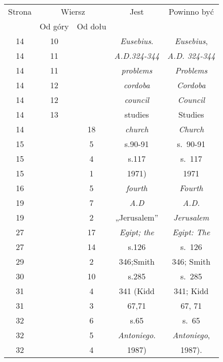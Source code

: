 \documentclass[a4paper,11pt]{article}
\numberwithin{equation}{section}
\begin{document}
\begin{center}

  \begin{tabular}{|c|c|c|c|c|}
    \hline
    Strona & \multicolumn{2}{c|}{Wiersz} & Jest
                              & Powinno być \\ \cline{2-3}
    & Od góry & Od dołu & & \\
    \hline
    \hphantom{0}14 & 10 & & \textit{Eusebius}. & \textit{Eusebius}, \\
    \hphantom{0}14 & 11 & & \textit{A.D.324-344} & \textit{A.D. 324-344} \\
    \hphantom{0}14 & 11 & & \textit{problems} & \textit{Problems} \\
    \hphantom{0}14 & 12 & & \textit{cordoba} & \textit{Cordoba} \\
    \hphantom{0}14 & 12 & & \textit{council} & \textit{Council} \\
    \hphantom{0}14 & 13 & & studies & Studies \\
    \hphantom{0}14 & & 18 & \textit{church} & \textit{Church} \\
    \hphantom{0}15 & & \hphantom{0}5 & s.90-91 & s.~90-91 \\
    \hphantom{0}15 & & \hphantom{0}4 & s.117 & s.~117 \\
    \hphantom{0}15 & & \hphantom{0}1 & 1971) & 1971 \\
    \hphantom{0}16 & & \hphantom{0}5 & \textit{fourth} & \textit{Fourth} \\
    \hphantom{0}19 & & \hphantom{0}7 & \textit{A.D} & \textit{A.D.} \\
    \hphantom{0}19 & & \hphantom{0}2 & „Jerusalem” & \textit{Jerusalem} \\
    \hphantom{0}27 & & 17 & \textit{Egipt; the} & \textit{Egipt: The} \\
    \hphantom{0}27 & & 14 & s.126 & s.~126 \\
    \hphantom{0}29 & & \hphantom{0}2 & 346;Smith & 346; Smith\\
    \hphantom{0}30 & & 10 & s.285 & s.~285 \\
    \hphantom{0}31 & & \hphantom{0}4 & 341 (Kidd & 341; Kidd \\
    \hphantom{0}31 & & \hphantom{0}3 & 67,71 & 67, 71 \\
    \hphantom{0}32 & & \hphantom{0}6 & s.65 & s.~65 \\
    \hphantom{0}32 & & \hphantom{0}5 & \textit{Antoniego}.
    & \textit{Antoniego}, \\
    \hphantom{0}32 & & \hphantom{0}4 & 1987) & 1987). \\

\end{tabular}
\end{center}
\end{document}
